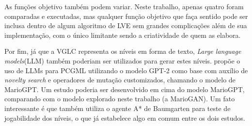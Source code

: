 As funções objetivo também podem variar. Neste trabalho, apenas quatro foram comparadas e executadas, mas qualquer função objetivo que faça sentido pode ser inclusa dentro de algum algoritmo de LVE sem grandes complicações além de sua implementação, com o único limitante sendo a criatividade de quem as elabora.

Por fim, já que a VGLC representa os níveis em forma de texto, \textit{Large language models}(LLM) também poderiam ser utilizados para gerar estes níveis. \citet{mariogpt} propõe o uso de LLMs para PCGML utilizando o modelo GPT-2 como base com auxílio de \textit{novelty search} e operadores de mutação customizados, chamando o modelo de MarioGPT. Um estudo poderia ser desenvolvido em cima do modelo MarioGPT, comparando com o modelo explorado neste trabalho (a MarioGAN). Um fato interessante é que \citet{mariogpt} também utiliza o agente A* de Baumgarten para teste de jogabilidade dos níveis, o que já estabelece algo em comum entre os dois estudos.
